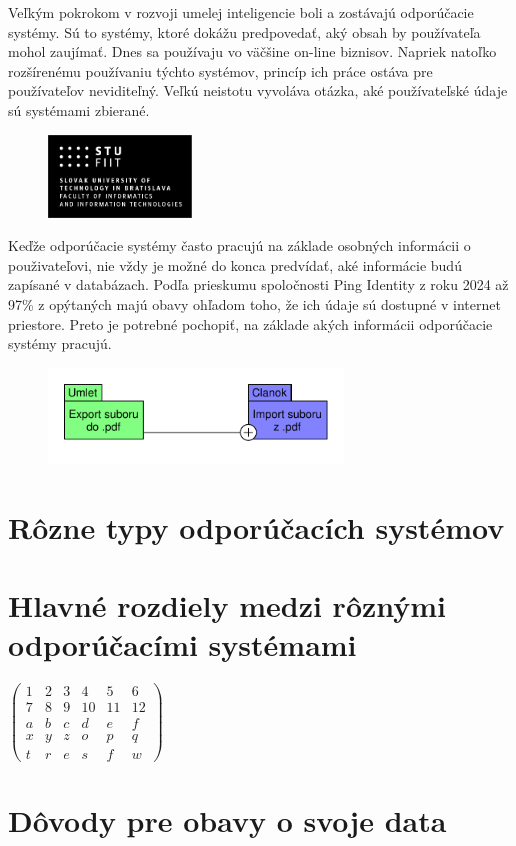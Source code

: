 \documentclass[10pt,twocolumn,twoside,slovak,a4paper]{article}
\begin{document}
Veľkým pokrokom v rozvoji umelej inteligencie boli a zostávajú odporúčacie systémy. Sú to systémy, ktoré dokážu predpovedať, aký obsah by používateľa mohol zaujímať. Dnes sa používaju vo väčšine on-line biznisov. Napriek natoľko rozšírenému používaniu týchto systémov, princíp ich práce ostáva pre používateľov neviditeľný. Veľkú neistotu vyvoláva otázka, aké používateľské údaje sú systémami zbierané. \begin{figure}
\includegraphics [width = 1.5in]{STU-FIIT.png}
\end{figure}Keďže odporúčacie systémy často pracujú na základe osobných informácii o použivateľovi, nie vždy je možné do konca predvídať, aké informácie budú zapísané v databázach. Podľa prieskumu spoločnosti Ping Identity z roku 2024 až 97\% z opýtaných majú obavy ohľadom toho, že ich údaje sú dostupné v internet priestore\cite{Ping:Fear}. Preto je potrebné pochopiť, na základe akých informácii odporúčacie systémy pracujú. 


\begin{figure}
\centering
\includegraphics[height =1in,width=\textwidth]{diagram_3.pdf}
\end{figure}

\section{Rôzne typy odporúčacích systémov}

\section{Hlavné rozdiely medzi rôznými odporúčacími systémami}
$\begin{pmatrix}
1&2&3&4&5&6\\
7&8&9&10&11&12\\
a&b&c&d&e&f\\
x&y&z&o&p&q\\
t&r&e&s&f&w
\end{pmatrix}$
\section{Dôvody pre obavy o svoje data}


\end{document}
